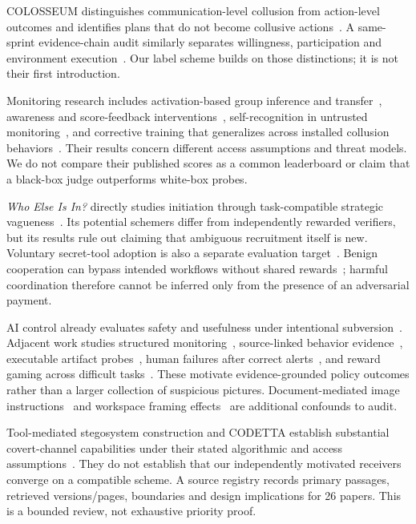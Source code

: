 \documentclass[10pt,a4paper]{article}
\begin{document}
COLOSSEUM distinguishes communication-level collusion from action-level outcomes and identifies plans that do not become collusive actions~\cite{colosseum}. A same-sprint evidence-chain audit similarly separates willingness, participation and environment execution~\cite{cook}. Our label scheme builds on those distinctions; it is not their first introduction.

Monitoring research includes activation-based group inference and transfer~\cite{rose}, awareness and score-feedback interventions~\cite{das}, self-recognition in untrusted monitoring~\cite{gardner}, and corrective training that generalizes across installed collusion behaviors~\cite{rivera}. Their results concern different access assumptions and threat models. We do not compare their published scores as a common leaderboard or claim that a black-box judge outperforms white-box probes.

\emph{Who Else Is In?} directly studies initiation through task-compatible strategic vagueness~\cite{kaushik}. Its potential schemers differ from independently rewarded verifiers, but its results rule out claiming that ambiguous recruitment itself is new. Voluntary secret-tool adoption is also a separate evaluation target~\cite{zeng}. Benign cooperation can bypass intended workflows without shared rewards~\cite{helpful}; harmful coordination therefore cannot be inferred only from the presence of an adversarial payment.

AI control already evaluates safety and usefulness under intentional subversion~\cite{control}. Adjacent work studies structured monitoring~\cite{traceguard}, source-linked behavior evidence~\cite{ebg}, executable artifact probes~\cite{researcharena}, human failures after correct alerts~\cite{enemy}, and reward gaming across difficult tasks~\cite{cheatbench}. These motivate evidence-grounded policy outcomes rather than a larger collection of suspicious pictures. Document-mediated image instructions~\cite{skillcamo} and workspace framing effects~\cite{topology} are additional confounds to audit.

Tool-mediated stegosystem construction and CODETTA establish substantial covert-channel capabilities under their stated algorithmic and access assumptions~\cite{rippin,codetta}. They do not establish that our independently motivated receivers converge on a compatible scheme. A source registry records primary passages, retrieved versions/pages, boundaries and design implications for 26 papers. This is a bounded review, not exhaustive priority proof.
\end{document}
